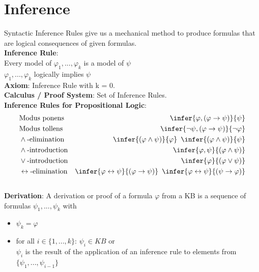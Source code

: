\section*{Inference}
Syntactic Inference Rules give us a mechanical method to produce formulas that are logical consequences of given formulas. \\
\textbf{Inference Rule}: \\
Every model of $\varphi_1,...,\varphi_k$ is a model of $\psi$ 
 \\
$\varphi_1,...,\varphi_k$ logically implies $\psi$ \\
\textbf{Axiom}: Inference Rule with k = 0. \\
\textbf{Calculus / Proof System}: Set of Inference Rules. \\
\textbf{Inference Rules for Propositional Logic}: 
\vspace{-0.3cm}
{\fontsize{6pt}{5pt}\selectfont
    \begin{align*}
        &\text{Modus ponens} & \infer{\varphi, (\varphi \rightarrow \psi)}{\psi}\\ 
        &\text{Modus tollens} & \infer{\neg\psi, (\varphi \rightarrow \psi)}{\neg\varphi}\\ 
        &\wedge\text{-elimination} & \infer{(\varphi \wedge \psi)}{\varphi} \makebox[5pt]{} \infer{(\varphi \wedge \psi)}{\psi} \\ 
        &\wedge\text{-introduction} & \infer{\varphi, \psi}{(\varphi\wedge\psi)} \\ 
        &\vee\text{-introduction} & \infer{\varphi}{(\varphi\vee\psi)} \\ 
        &\leftrightarrow\text{-elimination} & \infer{\varphi \leftrightarrow \psi}{(\varphi\rightarrow\psi)} \makebox[5pt]{} \infer{\varphi \leftrightarrow \psi}{(\psi\rightarrow\varphi)}
    \end{align*} \vspace{-0.3cm} \\
}
\fontsize{6pt}{5pt}\selectfont
\textbf{Derivation}: A derivation or proof of a formula $\varphi$ from a KB is a sequence of formulas $\psi_1,...,\psi_k$ with 
\begin{itemize}[noitemsep,topsep=0pt,leftmargin=*]
    \item $\psi_k = \varphi$
    \item for all $i \in \{1,...,k\}$: $\psi_i \in KB$ or \\
    $\psi_i$ is the result of the application of an inference rule to elements from $\{\psi_1,...,\psi_{i-1}\}$  
\end{itemize} 

